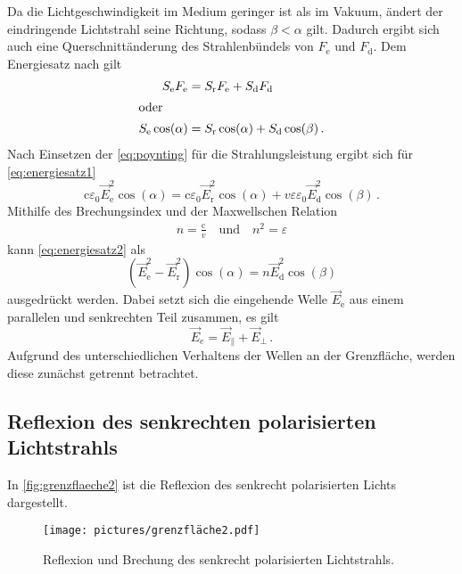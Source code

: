 Da die Lichtgeschwindigkeit im Medium geringer ist als im Vakuum,
ändert der eindringende Lichtstrahl seine Richtung, sodass $\beta < \alpha$ gilt.
Dadurch ergibt sich auch eine Querschnittänderung des Strahlenbündels von $F_\text{e}$ und $F_\text{d}$.
Dem Energiesatz nach gilt
\begin{align} \label{eq:energiesatz1}
    S_\text{e} F_\text{e} &= S_\text{r} F_\text{e} + S_\text{d} F_\text{d} \\
    \intertext{oder}
    S_\text{e} \cos(\alpha) &= S_\text{r} \cos(\alpha) + S_\text{d} \cos(\beta) \, .
\end{align}
Nach Einsetzen der \autoref{eq:poynting} für die Strahlungsleistung ergibt sich für \autoref{eq:energiesatz1} 
\begin{equation} \label{eq:energiesatz2}
    \text{c} \varepsilon_{0} \vec{E}_{\text{e}}^{2} \cos(\alpha) = \text{c} \varepsilon_{0} \vec{E}_{\text{r}}^{2} \cos(\alpha) + v \varepsilon \varepsilon_{0} \vec{E}_{\text{d}}^{2} \cos(\beta) \, .
\end{equation}
Mithilfe des Brechungsindex und der Maxwellschen Relation
\begin{align*}
    n = \frac{\text{c}}{v} \quad \text{und} \quad n^2 = \varepsilon
\end{align*}
kann \autoref{eq:energiesatz2} als
\begin{equation} \label{eq:energiesatz3}
    \left( \vec{E}_{\text{e}}^{2} - \vec{E}_{\text{r}}^{2} \right) \cos(\alpha) = n \vec{E}_{\text{d}}^{2} \cos(\beta)
\end{equation}  
ausgedrückt werden. 
Dabei setzt sich die eingehende Welle $\vec{E}_\text{e}$ aus einem parallelen und senkrechten Teil zusammen, es gilt
\begin{equation}
    \vec{E}_{e}=\vec{E}_{\|}+\vec{E}_{\perp} \, .
\end{equation}
Aufgrund des unterschiedlichen Verhaltens der Wellen an der Grenzfläche, werden diese zunächst getrennt betrachtet.


\subsection{Reflexion des senkrechten polarisierten Lichtstrahls}

In \autoref{fig:grenzflaeche2} ist die Reflexion des senkrecht polarisierten Lichts dargestellt.
\begin{figure}[ht]
    \centering
    \texttt{[image: pictures/grenzfläche2.pdf]}
    \caption{Reflexion und Brechung des senkrecht polarisierten Lichtstrahls. \cite{v407}}
    \label{fig:grenzflaeche2}
\end{figure}

